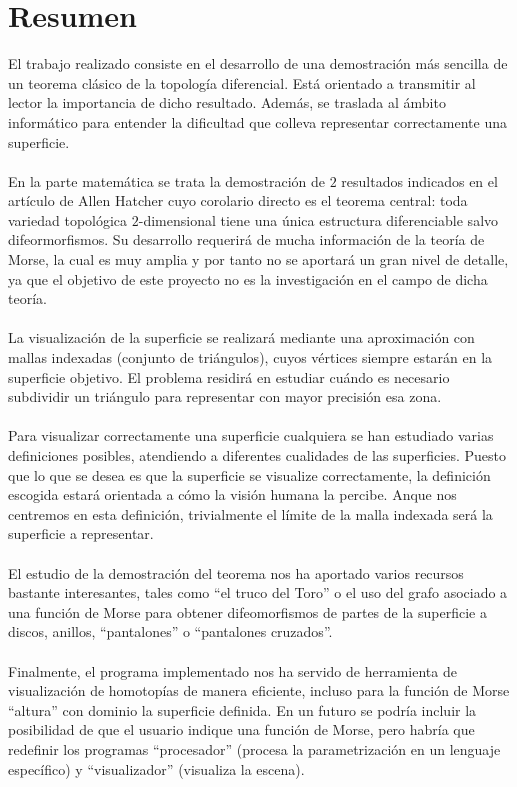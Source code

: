 %

\chapter{Resumen}
El trabajo realizado consiste en el desarrollo de una demostración más sencilla de un teorema clásico de la topología diferencial. Está orientado a transmitir al lector la importancia de dicho resultado. Además, se traslada al ámbito informático para entender la dificultad que colleva representar correctamente una superficie.\\
\\En la parte matemática se trata la demostración de $2$ resultados indicados en el artículo de Allen Hatcher \cite{arXiv:1312.3518} cuyo corolario directo es el teorema central: toda variedad topológica $2$-dimensional tiene una única estructura diferenciable salvo difeormorfismos. Su desarrollo requerirá de mucha información de la teoría de Morse, la cual es muy amplia y por tanto no se aportará un gran nivel de detalle, ya que el objetivo de este proyecto no es la investigación en el campo de dicha teoría.\\
\\La visualización de la superficie se realizará mediante una aproximación con mallas indexadas (conjunto de triángulos), cuyos vértices siempre estarán en la superficie objetivo. El problema residirá en estudiar cuándo es necesario subdividir un triángulo para representar con mayor precisión esa zona.\\
\\Para visualizar correctamente una superficie cualquiera se han estudiado varias definiciones posibles, atendiendo a diferentes cualidades de las superficies. Puesto que lo que se desea es que la superficie se visualize correctamente, la definición escogida estará orientada a cómo la visión humana la percibe. Anque nos centremos en esta definición, trivialmente el límite de la malla indexada será la superficie a representar.\\
\\El estudio de la demostración del teorema nos ha aportado varios recursos bastante interesantes, tales como ``el truco del Toro'' o el uso del grafo asociado a una función de Morse para obtener difeomorfismos de partes de la superficie a discos, anillos, ``pantalones'' o ``pantalones cruzados''.\\
\\Finalmente, el programa implementado nos ha servido de herramienta de visualización de homotopías de manera eficiente, incluso para la función de Morse ``altura'' con dominio la superficie definida. En un futuro se podría incluir la posibilidad de que el usuario indique una función de Morse, pero habría que redefinir los programas ``procesador'' (procesa la parametrización en un lenguaje específico) y ``visualizador'' (visualiza la escena).\\

